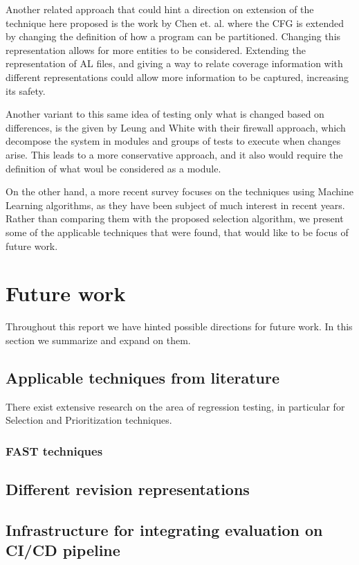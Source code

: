 \documentclass{article}
\begin{document}
Another related approach that could hint a direction on extension of the technique here proposed is the work by Chen et. al. \cite{TODO} where the CFG is extended by changing the definition of how a program can be partitioned. Changing this representation allows for more entities to be considered. Extending the representation of AL files, and giving a way to relate coverage information with different representations could allow more information to be captured, increasing its safety.

Another variant to this same idea of testing only what is changed based on differences, is the given by Leung and White with their firewall approach, which decompose the system in modules and groups of tests to execute when changes arise. This leads to a more conservative approach, and it also would require the definition of what woul be considered as a module.

On the other hand, a more recent survey focuses on the techniques using Machine Learning algorithms, as they have been subject of much interest in recent years. Rather than comparing them with the proposed selection algorithm, we present some of the applicable techniques that were found, that would like to be focus of future work.



\section{Future work}\label{section:future-work}
Throughout this report we have hinted possible directions for future work. In this section we summarize and expand on them. 

\subsection{Applicable techniques from literature}
There exist extensive research on the area of regression testing, in particular for Selection and Prioritization techniques.
\subsubsection{FAST techniques}
\subsection{Different revision representations}

\subsection{Infrastructure for integrating evaluation on CI/CD pipeline}
\end{document}
